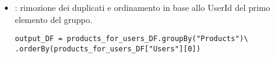 \begin{itemize}
    \item {}: rimozione dei duplicati e ordinamento in base allo UserId del primo elemento del gruppo.
     \begin{lstlisting}[style=all, style=PythonStyle]
output_DF = products_for_users_DF.groupBy("Products")\
.orderBy(products_for_users_DF["Users"][0])
\end{lstlisting}
  \end{itemize}